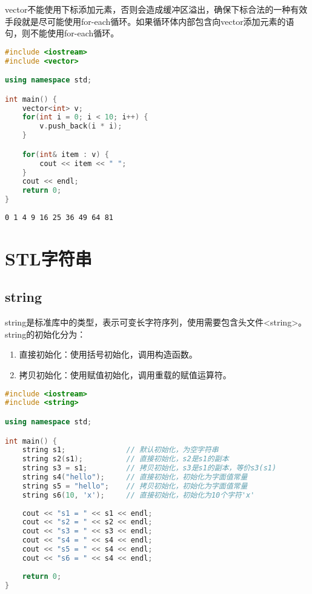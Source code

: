 vector不能使用下标添加元素，否则会造成缓冲区溢出，确保下标合法的一种有效手段就是尽可能使用for-each循环。如果循环体内部包含向vector添加元素的语句，则不能使用for-each循环。 \\


\begin{lstlisting}[language=C++]
#include <iostream>
#include <vector>

using namespace std;

int main() {
    vector<int> v;
    for(int i = 0; i < 10; i++) {
        v.push_back(i * i);
    }

    for(int& item : v) {
        cout << item << " ";
    }
    cout << endl;
    return 0;
}
\end{lstlisting}

\begin{tcolorbox}
	\begin{verbatim}
0 1 4 9 16 25 36 49 64 81
	\end{verbatim}
\end{tcolorbox}

\newpage

\section{STL字符串}

\subsection{string}

string是标准库中的类型，表示可变长字符序列，使用需要包含头文件<string>。 \\

string的初始化分为：

\begin{enumerate}
	\item 直接初始化：使用括号初始化，调用构造函数。
	\item 拷贝初始化：使用赋值初始化，调用重载的赋值运算符。
\end{enumerate}


\begin{lstlisting}[language=C++]
#include <iostream>
#include <string>

using namespace std;

int main() {
    string s1;              // 默认初始化，为空字符串
    string s2(s1);          // 直接初始化，s2是s1的副本
    string s3 = s1;         // 拷贝初始化，s3是s1的副本，等价s3(s1)
    string s4("hello");     // 直接初始化，初始化为字面值常量
    string s5 = "hello";    // 拷贝初始化，初始化为字面值常量
    string s6(10, 'x');     // 直接初始化，初始化为10个字符'x'
    
    cout << "s1 = " << s1 << endl;
    cout << "s2 = " << s2 << endl;
    cout << "s3 = " << s3 << endl;
    cout << "s4 = " << s4 << endl;
    cout << "s5 = " << s4 << endl;
    cout << "s6 = " << s4 << endl;
    
    return 0;
}
\end{lstlisting}

